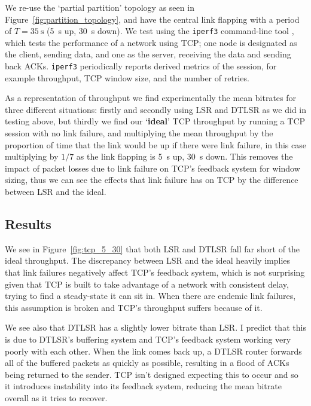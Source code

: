 \documentclass[withindex,glossary,openany]{cam-thesis}
\begin{document}
We re-use the `partial partition' topology as seen in Figure~\ref{fig:partition_topology}, and have the central link flapping with a period of $T=\SI{35}{\s}$ (\SI{5}{\s} up, \SI{30}{\s} down). We test using the \texttt{iperf3} command-line tool \cite{IPERF}, which tests the performance of a network using TCP; one node is designated as the client, sending data, and one as the server, receiving the data and sending back ACKs. \texttt{iperf3} periodically reports derived metrics of the session, for example throughput, TCP window size, and the number of retries.

As a representation of throughput we find experimentally the mean bitrates for three different situations: firstly and secondly using LSR and DTLSR as we did in testing above, but thirdly we find our `\textbf{ideal}' TCP throughput by running a TCP session with no link failure, and multiplying the mean throughput by the proportion of time that the link would be up if there were link failure, in this case multiplying by $1/7$ as the link flapping is \SI{5}{\s} up, \SI{30}{\s} down. This removes the impact of packet losses due to link failure on TCP's feedback system for window sizing, thus we can see the effects that link failure has on TCP by the difference between LSR and the ideal.

\subsection{Results}

We see in Figure~\ref{fig:tcp_5_30} that both LSR and DTLSR fall far short of the ideal throughput. The discrepancy between LSR and the ideal heavily implies that link failures negatively affect TCP's feedback system, which is not surprising given that TCP is built to take advantage of a network with consistent delay, trying to find a steady-state it can sit in. When there are endemic link failures, this assumption is broken and TCP's throughput suffers because of it.

We see also that DTLSR has a slightly lower bitrate than LSR. I predict that this is due to DTLSR's buffering system and TCP's feedback system working very poorly with each other. When the link comes back up, a DTLSR router forwards all of the buffered packets as quickly as possible, resulting in a flood of ACKs being returned to the sender. TCP isn't designed expecting this to occur and so it introduces instability into its feedback system, reducing the mean bitrate overall as it tries to recover.
\end{document}
